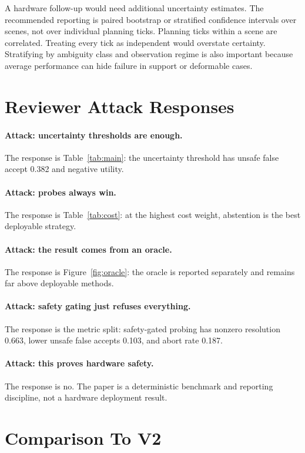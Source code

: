 \documentclass{article}
\begin{document}
A hardware follow-up would need additional uncertainty estimates. The recommended reporting is paired bootstrap or stratified confidence intervals over scenes, not over individual planning ticks. Planning ticks within a scene are correlated. Treating every tick as independent would overstate certainty. Stratifying by ambiguity class and observation regime is also important because average performance can hide failure in support or deformable cases.

\section{Reviewer Attack Responses}

\paragraph{Attack: uncertainty thresholds are enough.}
The response is Table~\ref{tab:main}: the uncertainty threshold has unsafe false accept 0.382 and negative utility.

\paragraph{Attack: probes always win.}
The response is Table~\ref{tab:cost}: at the highest cost weight, abstention is the best deployable strategy.

\paragraph{Attack: the result comes from an oracle.}
The response is Figure~\ref{fig:oracle}: the oracle is reported separately and remains far above deployable methods.

\paragraph{Attack: safety gating just refuses everything.}
The response is the metric split: safety-gated probing has nonzero resolution 0.663, lower unsafe false accepts 0.103, and abort rate 0.187.

\paragraph{Attack: this proves hardware safety.}
The response is no. The paper is a deterministic benchmark and reporting discipline, not a hardware deployment result.

\section{Comparison To V2}
\end{document}
